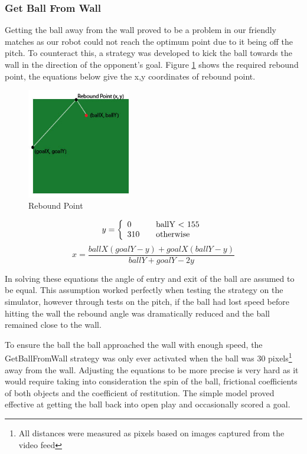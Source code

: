 \subsubsection{Get Ball From Wall}
Getting the ball away from the wall proved to be a problem in our friendly matches as our robot could not reach the optimum point due to it being off the pitch. To counteract this, a strategy was developed to kick the ball towards the wall in the direction of the opponent's goal. Figure \ref{fig:rebound} shows the required rebound point, the equations below give the x,y coordinates of rebound point.

\begin{figure}[htp]
\begin{center}
\leavevmode
\includegraphics[width=0.4\textwidth] {images/rebound.jpg}
\end{center}
\caption{Rebound Point}
\label{fig:rebound}
\end{figure}

\[y = \left\{ 
\begin{array}{l l}
  0 & \quad \mbox{ballY $<$ 155}\\
  310 & \quad \mbox{otherwise}\\ \end{array} \right. \]
\[x = \frac{ballX(goalY-y) + goalX(ballY-y)}{ballY + goalY - 2y} \]

In solving these equations the angle of entry and exit of the ball are assumed to be equal. This assumption worked perfectly when testing the strategy on the simulator, however through tests on the pitch, if the ball had lost speed before hitting the wall the rebound angle was dramatically reduced and the ball remained close to the wall. 

To ensure the ball the ball approached the wall with enough speed, the GetBallFromWall strategy was only ever activated when the ball was 30 pixels\footnote{All distances were measured as pixels based on images captured from the video feed} away from the wall. Adjusting the equations to be more precise is very hard as it would require taking into consideration the spin of the ball, frictional coefficients of both objects and the coefficient of restitution. The simple model proved effective at getting the ball back into open play and occasionally scored a goal.\linebreak

